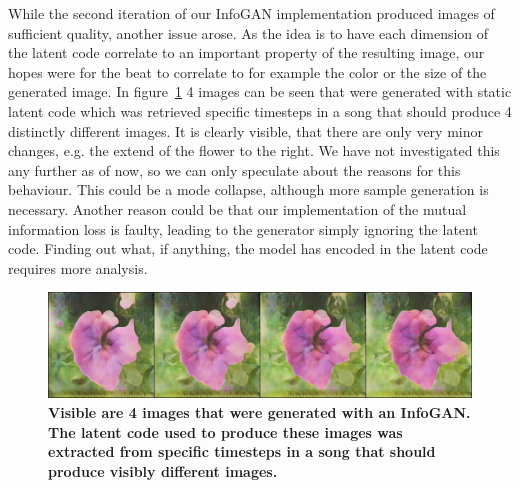         While the second iteration of our InfoGAN implementation produced images of sufficient quality, another issue arose. As the idea is to have each dimension of the latent code correlate to an important property of the resulting image, our hopes were for the beat to correlate to for example the color or the size of the generated image. In figure~\ref{fig:infogan_res_2} 4 images can be seen that were generated with static latent code which was retrieved specific timesteps in a song that should produce 4 distinctly different images. It is clearly visible, that there are only very minor changes, e.g. the extend of the flower to the right. We have not investigated this any further as of now, so we can only speculate about the reasons for this behaviour. This could be a mode collapse, although more sample generation is necessary. Another reason could be that our implementation of the mutual information loss is faulty, leading to the generator simply ignoring the latent code. Finding out what, if anything, the model has encoded in the latent code requires more analysis.
        
        \begin{figure}[ht]
            \centering
            \includegraphics[width=.94\textwidth]{images/fixed_160}
            \caption[Images generated from InfoGan.]
            {
                \textbf{Visible are 4 images that were generated with an InfoGAN. The latent code used to produce these images was extracted from specific timesteps in a song that should produce visibly different images.}
            }
            \label{fig:infogan_res_2}
        \end{figure}